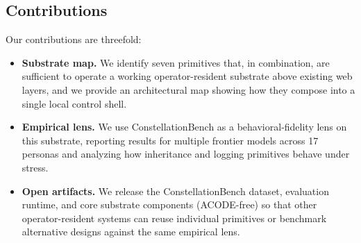 \subsection{Contributions}

Our contributions are threefold:
\begin{itemize}
  \item \textbf{Substrate map.} We identify seven primitives that, in combination,
        are sufficient to operate a working operator-resident substrate above
        existing web layers, and we provide an architectural map showing how
        they compose into a single local control shell.
  \item \textbf{Empirical lens.} We use ConstellationBench as a behavioral-fidelity
        lens on this substrate, reporting results for multiple frontier models
        across 17 personas and analyzing how inheritance and logging primitives
        behave under stress.
  \item \textbf{Open artifacts.} We release the ConstellationBench dataset,
        evaluation runtime, and core substrate components (ACODE-free) so that
        other operator-resident systems can reuse individual primitives or
        benchmark alternative designs against the same empirical lens.
\end{itemize}
